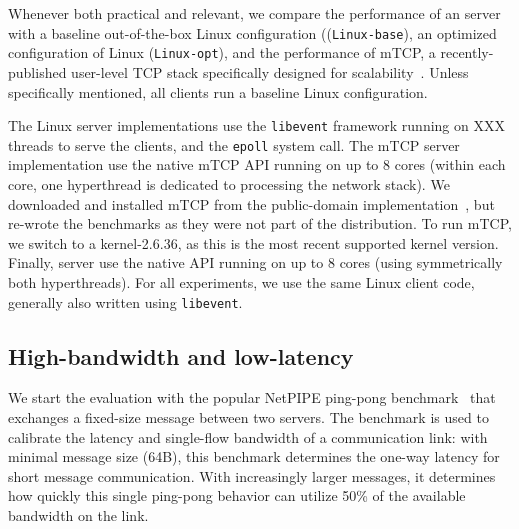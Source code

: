 





Whenever both practical and relevant, we compare the performance of an
\ix server with a baseline out-of-the-box Linux configuration
((\texttt{Linux-base}), an optimized configuration of Linux
(\texttt{Linux-opt}), and the performance of mTCP, a
recently-published user-level TCP stack specifically designed for
scalability~\cite{jeong2014mtcp}.  Unless specifically mentioned, all
clients run a baseline Linux configuration. 

The Linux server implementations use the \texttt{libevent} framework
running on XXX threads to serve the clients, and the \texttt{epoll} system call. The mTCP server
implementation use the native mTCP API running on up to 8 cores
(within each core, one hyperthread is dedicated to processing the
network stack).  We downloaded and installed mTCP
from the public-domain implementation~\cite{url:mtcp}, but re-wrote the
benchmarks as they were not part of the distribution.  To run mTCP, we
switch to a kernel-2.6.36, as this is the most recent supported kernel
version.
Finally, \ix server use
the native \ix API running on up to 8 cores (using symmetrically both
hyperthreads).  For all experiments, we use the same Linux client code, generally also written using \texttt{libevent}.


\subsection{High-bandwidth and low-latency}
\label{sec:eval:netpipe}


We start the evaluation with the popular NetPIPE ping-pong
benchmark~\cite{snell1996netpipe} that exchanges a fixed-size message
between two servers.  The benchmark is used to calibrate the latency
and single-flow bandwidth of a communication link: with minimal
message size (64B), this benchmark determines the one-way latency for
short message communication.  With increasingly larger messages, it
determines how quickly this single ping-pong behavior can utilize 50\%
of the available bandwidth on the link.


